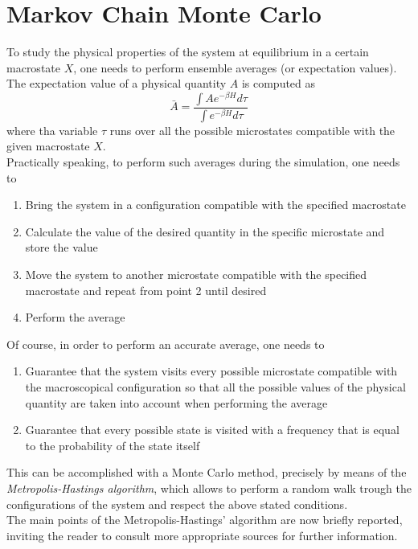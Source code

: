 \section{Markov Chain Monte Carlo}
\label{sec:MCMC}
To study the physical properties of the system at equilibrium in a certain macrostate $X$, one needs to perform ensemble averages (or expectation values). The expectation value of a physical quantity $A$ is computed as 
\begin{equation}
    \bar A = \frac{\int A e^{-\beta H} d\tau}{\int e^{-\beta H} d \tau}
    \label{eq:averageval}
\end{equation}
where tha variable $\tau$ runs over all the possible microstates compatible with the given macrostate $X$. \\
Practically speaking, to perform such averages during the simulation, one needs to
\begin{enumerate}
    \item Bring the system in a configuration compatible with the specified macrostate 
    \item Calculate the value of the desired quantity in the specific microstate and store the value
    \item Move the system to another microstate compatible with the specified macrostate and repeat from point 2 until desired
    \item Perform the average
\end{enumerate}
Of course, in order to perform an accurate average, one needs to 
\begin{enumerate}
    \item Guarantee that the system visits every possible microstate compatible with the macroscopical configuration so that all the possible values of the physical quantity are taken into account when performing the average
    \item Guarantee that every possible state is visited with a frequency that is equal to the probability of the state itself
\end{enumerate}
This can be accomplished with a Monte Carlo method, precisely by means of the \emph{Metropolis-Hastings algorithm}, which allows to perform a random walk trough the configurations of the system and respect the above stated conditions. \\
The main points of the Metropolis-Hastings' \cite{Hastings} algorithm are now briefly reported, inviting the reader to consult more appropriate sources for further information. \par
